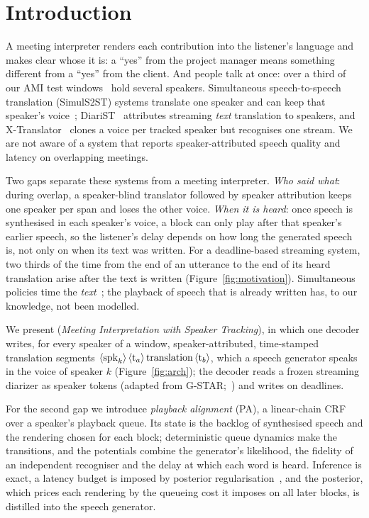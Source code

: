 \section{Introduction}
\label{sec:intro}



A meeting interpreter renders each contribution into the listener's language and makes clear whose it is: a
``yes'' from the project manager means something different from a ``yes'' from the client. And people talk at once:
over a third of our AMI test windows~\citep{carletta2005ami} hold several speakers. Simultaneous speech-to-speech
translation (SimulS2ST) systems translate one speaker and can keep that speaker's
voice~\citep{seamless2023,labiausse2025hibiki,cheng2025liveinterpret,deng2025simuls2s};
DiariST~\citep{yang2024diarist} attributes streaming \emph{text} translation to speakers, and
X-Translator~\citep{zhao2026xtranslator} clones a voice per tracked speaker but recognises one stream. We are not aware
of a system that reports speaker-attributed speech quality and latency on overlapping meetings.

Two gaps separate these systems from a meeting interpreter. \emph{Who said what}: during overlap, a speaker-blind
translator followed by speaker attribution keeps one speaker per span and loses the other voice. \emph{When it is
heard}: once speech is synthesised in each speaker's voice, a block can only play after that speaker's earlier speech,
so the listener's delay depends on how long the generated speech is, not only on when its text was written. For a
deadline-based streaming system, two thirds of the time from the end of an utterance to the end of its heard translation
arise after the text is written (Figure~\ref{fig:motivation}). Simultaneous policies time the
\emph{text}~\citep{ma2019stacl,arivazhagan2019milk,zhang2023hmt}; the playback of speech that is already written
has, to our knowledge, not been modelled.

We present \sys{} (\emph{Meeting Interpretation with Speaker Tracking}), in which one decoder writes, for every speaker
of a window, speaker-attributed, time-stamped translation segments $\langle\mathrm{spk}_{k}\rangle\,\langle\mathrm{t}_{a}\rangle\,\text{translation}\,\langle\mathrm{t}_{b}\rangle$,
which a speech generator speaks in the voice of speaker $k$ (Figure~\ref{fig:arch}); the decoder reads a frozen
streaming diarizer as speaker tokens (adapted from G-STAR;~\citealp{peng2026gstar}) and writes on deadlines.

For the second gap we introduce \emph{playback alignment} (PA), a linear-chain CRF over a speaker's playback queue. Its
state is the backlog of synthesised speech and the rendering chosen for each block; deterministic queue dynamics make
the transitions, and the potentials combine the generator's likelihood, the fidelity of an independent recogniser and
the delay at which each word is heard. Inference is exact, a latency budget is imposed by posterior
regularisation~\citep{ganchev2010posterior}, and the posterior, which prices each rendering by the queueing cost it
imposes on all later blocks, is distilled into the speech generator.

